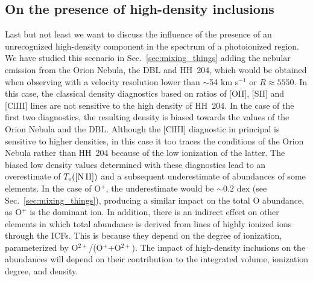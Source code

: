 \documentclass[twocolumn]{aastex63}
\begin{document}
\subsection{On the presence of high-density inclusions}
\label{subsec:highdensity}
Last but not least we want to discuss the influence of the presence of an unrecognized high-density component in the spectrum of a photoionized region. 
We have studied this scenario in Sec.~\ref{sec:mixing_things} adding the nebular emission from the Orion Nebula, the DBL and HH~204, which would be obtained when observing with a velocity resolution  lower than 
$\sim$54 km s$^{-1}$ or $R \approx 5550$. 
In this case, the classical density diagnostics based on ratios of [O\thinspace II], [S\thinspace II] and [Cl\thinspace III] lines are not sensitive to the high density of HH~204. 
In the case of the first two diagnostics, the resulting density is biased towards the values of the Orion Nebula and the DBL. 
Although the [Cl\thinspace III] diagnostic in principal is sensitive to higher densities, 
in this case it too traces the conditions of the Orion Nebula rather than HH~204 because of the low ionization of the latter.
The biased low density values determined with these diagnostics lead to an overestimate of $T_{\rm e}(\text{[N\thinspace II]})$ and a subsequent underestimate of abundances of some elements. 
In the case of O$^{+}$, the underestimate would be $\sim 0.2 \text{ dex}$ (see Sec.~\ref{sec:mixing_things}), producing a similar impact on the total O abundance, as O$^{+}$ is the dominant ion. 
In addition, there is an indirect effect on other elements in which total abundance is derived from lines of highly ionized ions through the ICFs.
This is because they depend on the degree of ionization, parameterized by   O$^{2+}$/(O$^{+}$+O$^{2+}$). 
The impact of high-density inclusions on the abundances will depend on their contribution to the integrated volume, ionization degree, and density.
\end{document}
